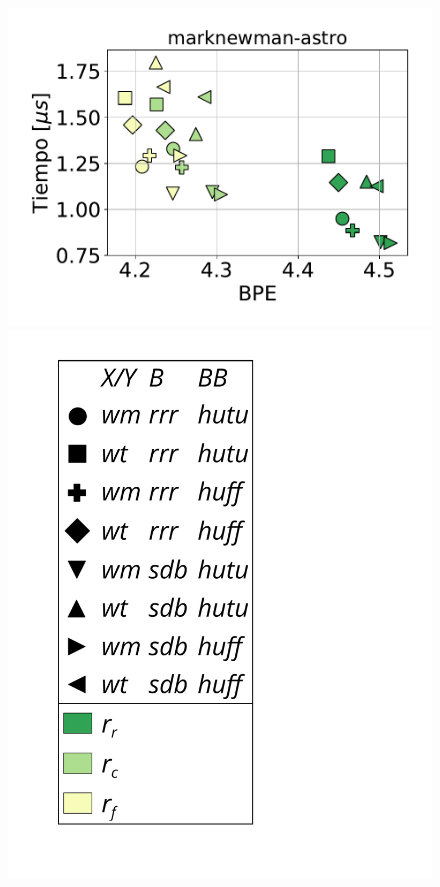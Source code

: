 \begin{figure}
    	\centering
    	\begin{minipage}{1\textwidth}
    		\centering
    		\begin{minipage}{0.45\textwidth}
    			\centering
    			\begin{minipage}{0.75\textwidth}
    				\centering
    				\includegraphics[width=1\linewidth]{img/sdsl/secuencial/marknewman-astro.pdf}
    			\end{minipage}
    			\begin{minipage}{0.2\textwidth}
    				\centering
    				\includegraphics[scale=.16, clip, trim=70 0 0 0]{img/sdsl/label.pdf}

\end{minipage}
\end{minipage}
\end{minipage}
\end{figure}
